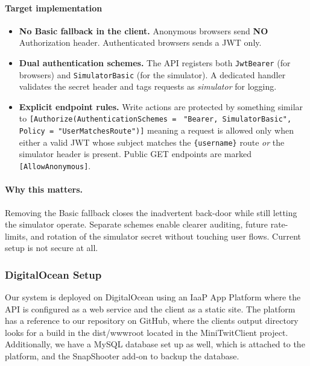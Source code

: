 \paragraph{Target implementation}
\begin{itemize}
  \item \textbf{No Basic fallback in the client.}  
        Anonymous browsers send \textbf{NO} Authorization header.
        Authenticated browsers sends a JWT only.
  \item \textbf{Dual authentication schemes.}  
        The API registers both
        \texttt{JwtBearer} (for browsers) and \texttt{SimulatorBasic}
        (for the simulator).  A dedicated handler validates the secret
        header and tags requests as \emph{simulator} for logging.
  \item \textbf{Explicit endpoint rules.}  
        Write actions are protected by something similar to 
        \verb|[Authorize(AuthenticationSchemes =|
        \verb| "Bearer, SimulatorBasic",|
        \verb| Policy = "UserMatchesRoute")]|
        meaning a request is allowed only when
        either a valid JWT whose subject matches the
        \texttt{\{username\}} route \emph{or} the simulator header is
        present.  Public GET endpoints are marked
        \verb|[AllowAnonymous]|.
\end{itemize}

\paragraph{Why this matters.}
Removing the Basic fallback closes the inadvertent back-door while still
letting the simulator operate.  Separate schemes enable clearer auditing,
future rate-limits, and rotation of the simulator secret without touching
user flows. Current setup is not secure at all.

\subsubsection{DigitalOcean Setup}
Our system is deployed on DigitalOcean using an IaaP App Platform where the API is configured as a web service and the client as a static site. The platform has a reference to our repository on GitHub, where the clients output directory looks for a build in the dist/wwwroot located in the MiniTwitClient project. Additionally, we have a MySQL database set up as well, which is attached to the platform, and the SnapShooter add-on to backup the database.